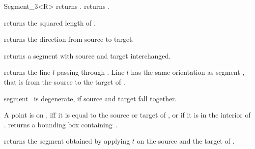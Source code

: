 \begin{ccRefClass} {Segment_3<R>}
       {returns .}
\ccGlue
{}
       {returns .}

       {returns the squared length of \ccVar. }

       {returns the direction from source to target.}


       {returns a segment with source and target interchanged.}

       {returns the line $l$ passing through \ccVar. Line $l$  has the
        same orientation as segment \ccVar, that is 
        from the source to the target of \ccVar.}

       {segment \ccVar\ is degenerate, if source and target fall together.}


       {A point is on \ccVar, iff it is equal to the source or target
        of \ccVar, or if it is in the interior of \ccVar.}
% 
% 
       {returns a bounding box containing~\ccVar.}

       {returns the segment obtained by applying $t$ on the source
        and the target of \ccVar.}

\end{ccRefClass} 
